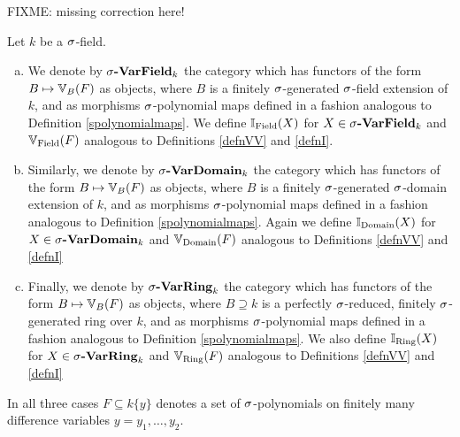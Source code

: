 FIXME: missing correction here!
\begin{defn}
Let $k$ be a $\sigma$-field. 
\begin{enumerate}[(a)]
\item We denote by $\sigma\text{{\normalfont\textbf{-VarField}}}_k$ the category which has functors of the form $B \mapsto \mathbb{V}_B(F)$ as objects, where $B$ is a finitely $\sigma$-generated $\sigma$-field extension of $k$,
 and as morphisms $\sigma$-polynomial maps defined in a fashion analogous to Definition \ref{spolynomialmaps}. We define $\mathbb{I}_{\operatorname{Field}}(X)$ for $X \in \sigma\text{{\normalfont\textbf{-VarField}}}_k$ and $\mathbb{V}_{\operatorname{Field}}(F)$ analogous to Definitions \ref{defnVV} and \ref{defnI}.
\item Similarly, we denote by $\sigma\text{{\normalfont\textbf{-VarDomain}}}_k$ the category which has functors of the form $B \mapsto \mathbb{V}_B(F)$ as objects, where $B$ is a finitely $\sigma$-generated $\sigma$-domain extension of $k$,
 and as morphisms $\sigma$-polynomial maps defined in a fashion analogous to Definition \ref{spolynomialmaps}. Again we define $\mathbb{I}_{\operatorname{Domain}}(X)$ for $X \in \sigma\text{{\normalfont\textbf{-VarDomain}}}_k$ and $\mathbb{V}_{\operatorname{Domain}}(F)$ analogous to Definitions \ref{defnVV} and \ref{defnI}
\item Finally,  we denote by $\sigma\text{{\normalfont\textbf{-VarRing}}}_k$ the category which has functors of the form $B \mapsto \mathbb{V}_B(F)$ as objects, where $B \supseteq k$ is a perfectly $\sigma$-reduced, finitely $\sigma$-generated ring over $k$,
 and as morphisms $\sigma$-polynomial maps defined in a fashion analogous to Definition \ref{spolynomialmaps}. We also define $\mathbb{I}_{\operatorname{Ring}}(X)$ for $X \in \sigma\text{{\normalfont\textbf{-VarRing}}}_k$ and $\mathbb{V}_{\operatorname{Ring}}(F)$ analogous to Definitions \ref{defnVV} and \ref{defnI}
\end{enumerate}
In all three cases $F \subseteq k\{y\}$ denotes a set of $\sigma$-polynomials on finitely many difference variables $y = y_1, \ldots, y_2$.
\end{defn}

